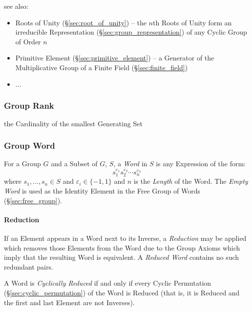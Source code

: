 see also:
\begin{itemize}
  \item Roots of Unity (\S\ref{sec:root_of_unity}) -- the $n$th Roots of Unity
    form an irreducible Representation (\S\ref{sec:group_representation}) of any
    Cyclic Group of Order $n$
  \item Primitive Element (\S\ref{sec:primitive_element}) -- a Generator of the
    Multiplicative Group of a Finite Field (\S\ref{sec:finite_field})
  \item ...
\end{itemize}



\subsubsection{Group Rank}\label{sec:group_rank}

the Cardinality of the smallest Generating Set



\subsubsection{Group Word}\label{sec:group_word}

For a Group $G$ and a Subset of $G$, $S$, a \emph{Word} in $S$ is any Expression
of the form:
\[
    s_1^{\varepsilon_1}s_2^{\varepsilon_2} \cdots s_n^{\varepsilon_n}
\]
where $s_1,\ldots,s_n \in S$ and $\varepsilon_i \in \{-1, 1\}$ and $n$ is the
\emph{Length} of the Word. The \emph{Empty Word} is used as the Identity Element
in the Free Group of Words (\S\ref{sec:free_group}).



\paragraph{Reduction}\label{sec:word_reduction}\hfill

If an Element appears in a Word next to its Inverse, a \emph{Reduction} may be
applied which removes those Elements from the Word due to the Group Axioms which
imply that the resulting Word is equivalent. A \emph{Reduced Word} contains no
such redundant pairs.

A Word is \emph{Cyclically Reduced} if and only if every Cyclic Permutation
(\S\ref{sec:cyclic_permutation}) of the Word is Reduced (that is, it is Reduced
and the first and last Element are not Inverses).



